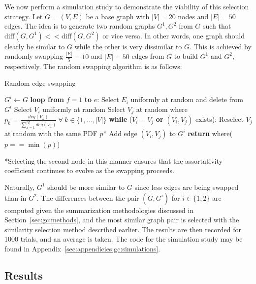 We now perform a simulation study to demonstrate the viability of this 
selection strategy. Let $G=(V,E)$ be a base graph with $|V|=20$ nodes and 
$|E|=50$ edges. The idea is to generate two random graphs $G^1, G^2$ from $G$ 
such that $\text{diff}(G,G^1) << \text{diff}(G,G^2)$ or vice versa. 
In other words, one graph should clearly be similar to $G$ while the other is 
very dissimilar to $G$. This is achieved by randomly swapping $\frac{|E|}{5} = 
10$ and $|E| = 50$ edges from $G$ to build $G^1$ and $G^2$, respectively. 
The random swapping algorithm is as follows:

\tablespacing
\begin{algorithm}[H]
	\caption{Random edge swapping}\label{alg:gc:simulations:swapping}
	\begin{algorithmic}[1]
		\State $G^i \gets G$
		\State \textbf{loop from} $f=1$ \textbf{to} $e$:
		\State \indent Select $E_i$ uniformly at random and delete from $G^i$
		\State \indent Select $V_i$ uniformly at random
		\State \indent Select $V_j$ at random where 
		$p_k = \frac{deg(V_k)}{\sum\limits_{x=1}^{|V|} deg(V_x)} \ \forall \
		k \in \{1,...,|V|\}$
		\State \indent \textbf{while} ($V_i = V_j$ \textbf{or} $(V_i,V_j)$ 
		exists):
		\State \indent \indent Reselect $V_j$ at random with the same PDF $p$*
		\State \indent Add edge $(V_i,V_j)$ to $G^i$
		\State \textbf{return} where($p==\min{(p)}$)
		\EndProcedure
	\end{algorithmic}
	*Selecting the second node in this manner ensures that the assortativity 
	coefficient continues to evolve as the swapping proceeds. 
\end{algorithm}
\bodyspacing

\noindent Naturally, $G^1$ should be more similar to $G$ since less 
edges are being swapped than in $G^2$. The differences between the pair 
$(G,G^i)$ for $i \in \{1,2\}$ are computed given the summarization 
methodologies discussed in Section~\ref{sec:gc:methods}, and the most similar 
graph pair is selected with the similarity selection method described earlier. 
The results are then recorded for 1000 trials, and an average is taken. 
The code for the simulation study may be found in 
Appendix~\ref{sec:appendicies:gc:simulations}. 

\subsection{Results}
\label{sec:gc:simulations:results}

